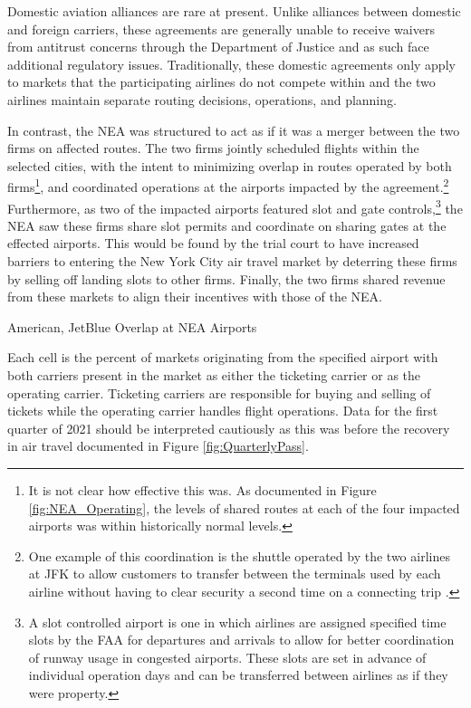 \documentclass{article}
\begin{document}
	Domestic aviation alliances are rare at present. Unlike alliances between domestic and foreign carriers, these agreements are generally unable to receive waivers from antitrust concerns through the Department of Justice and as such face additional regulatory issues. Traditionally, these domestic agreements only apply to markets that the participating airlines do not compete within and the two airlines maintain separate routing decisions, operations, and planning. 
	
	In contrast, the NEA was structured to act as if it was a merger between the two firms on affected routes. The two firms jointly scheduled flights within the selected cities, with the intent to minimizing overlap in routes operated by both firms\footnote{It is not clear how effective this was. As documented in Figure \ref{fig:NEA_Operating}, the levels of shared routes at each of the four impacted airports was within historically normal levels.}, and coordinated operations at the airports impacted by the agreement.\footnote{One example of this coordination is the shuttle operated by the two airlines at JFK to allow customers to transfer between the terminals used by each airline without having to clear security a second time on a connecting trip \citep{griff_riding_2021}.} Furthermore, as two of the impacted airports featured slot and gate controls,\footnote{A slot controlled airport is one in which airlines are assigned specified time slots by the FAA for departures and arrivals to allow for better coordination of runway usage in congested airports. These slots are set in advance of individual operation days and can be transferred between airlines as if they were property.} the NEA saw these firms share slot permits and coordinate on sharing gates at the effected airports. This would be found by the trial court to have increased barriers to entering the New York City air travel market by deterring these firms by selling off landing slots to other firms. Finally, the two firms shared revenue from these markets to align their incentives with those of the NEA. 

    \begin{table}[h]
		\caption{American, JetBlue Overlap at NEA Airports}
		\label{tab:NEA_Airport_Prescence}
        \vspace{-15mm}
        \begin{center}
            		
        \end{center}
                \vspace{-5mm}
		\footnotesize{Each cell is the percent of markets originating from the specified airport with both carriers present in the market as either the ticketing carrier or as the operating carrier. Ticketing carriers are responsible for buying and selling of tickets while the operating carrier handles flight operations. Data for the first quarter of 2021 should be interpreted cautiously as this was before the recovery in air travel documented in Figure \ref{fig:QuarterlyPass}.}
	\end{table}
    
\end{document}
